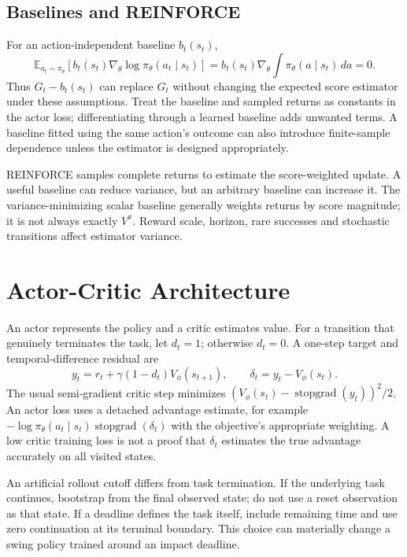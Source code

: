 \subsection{Baselines and REINFORCE}

For an action-independent baseline $b_t(s_t)$,
\begin{equation}
\mathbb E_{a_t\sim\pi_\theta}
[b_t(s_t)\nabla_\theta\log\pi_\theta(a_t\mid s_t)]
=b_t(s_t)\nabla_\theta\int\pi_\theta(a\mid s_t)\,da=0.
\end{equation}
Thus $G_t-b_t(s_t)$ can replace $G_t$ without changing the expected score estimator under these assumptions. Treat the baseline and sampled returns as constants in the actor loss; differentiating through a learned baseline adds unwanted terms. A baseline fitted using the same action's outcome can also introduce finite-sample dependence unless the estimator is designed appropriately.

REINFORCE samples complete returns to estimate the score-weighted update. A useful baseline can reduce variance, but an arbitrary baseline can increase it. The variance-minimizing scalar baseline generally weights returns by score magnitude; it is not always exactly $V^\pi$. Reward scale, horizon, rare successes and stochastic transitions affect estimator variance.

\section{Actor-Critic Architecture}

An actor represents the policy and a critic estimates value. For a transition that genuinely terminates the task, let $d_t=1$; otherwise $d_t=0$. A one-step target and temporal-difference residual are
\begin{equation}
y_t=r_t+\gamma(1-d_t)V_\phi(s_{t+1}),\qquad
\delta_t=y_t-V_\phi(s_t).
\end{equation}
The usual semi-gradient critic step minimizes $(V_\phi(s_t)-\operatorname{stopgrad}(y_t))^2/2$. An actor loss uses a detached advantage estimate, for example $-\log\pi_\theta(a_t\mid s_t)\operatorname{stopgrad}(\delta_t)$ with the objective's appropriate weighting. A low critic training loss is not a proof that $\delta_t$ estimates the true advantage accurately on all visited states.

An artificial rollout cutoff differs from task termination. If the underlying task continues, bootstrap from the final observed state; do not use a reset observation as that state. If a deadline defines the task itself, include remaining time and use zero continuation at its terminal boundary. This choice can materially change a swing policy trained around an impact deadline.


